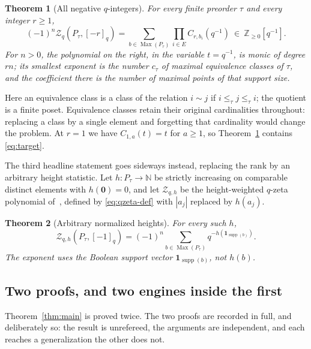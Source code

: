 \documentclass[11pt]{article}
\numberwithin{equation}{section}
\newtheorem{theorem}{Theorem}[section]
\theoremstyle{definition}
\theoremstyle{remark}
\newcommand{\N}{\mathbb N}
\newcommand{\Z}{\mathbb Z}
\newcommand{\one}{\mathbf 1}
\newcommand{\zero}{\mathbf 0}
\newcommand{\supp}{\operatorname{supp}}
\newcommand{\Max}{\operatorname{Max}}
\newcommand{\qint}[1]{[#1]_q}
\newcommand{\Zeta}{\mathcal Z}
\begin{document}
\begin{theorem}[All negative $q$-integers]
\label{thm:allnegative}
For every finite preorder $\tau$ and every integer $r\ge1$,
\begin{equation}
 (-1)^n \Zeta_q(P_\tau,\qint{-r})
 =\sum_{b\in \Max(P_\tau)}\prod_{i\in E}C_{r,b_i}(q^{-1})
 \ \in\ \Z_{\ge0}[q^{-1}].
 \label{eq:allnegative}
\end{equation}
For $n>0$, the polynomial on the right, in the variable $t=q^{-1}$, is monic
of degree $rn$; its smallest exponent is the number $c_\tau$ of maximal
equivalence classes of $\tau$, and the coefficient there is the number of
maximal points of that support size.
\end{theorem}

Here an equivalence class is a class of the relation $i\sim j$ if $i\le_\tau
j\le_\tau i$; the quotient is a finite poset. Equivalence classes retain their
original cardinalities throughout: replacing a class by a single element and
forgetting that cardinality would change the problem. At $r=1$ we have
$C_{1,a}(t)=t$ for $a\ge1$, so Theorem~\ref{thm:allnegative} contains
\eqref{eq:target}.

The third headline statement goes sideways instead, replacing the rank by an
arbitrary height statistic. Let $h:P_\tau\to\N$ be strictly increasing on
comparable distinct elements with $h(\zero)=0$, and let $\Zeta_{q,h}$ be the
height-weighted $q$-zeta polynomial of~\cite{Chapoton}, defined by
\eqref{eq:qzeta-def} with $|a_j|$ replaced by $h(a_j)$.

\begin{theorem}[Arbitrary normalized heights]
\label{thm:height-intro}
For every such $h$,
\begin{equation}
 \Zeta_{q,h}(P_\tau,\qint{-1})
 =(-1)^n\sum_{b\in\Max(P_\tau)}q^{-h(\one_{\supp(b)})}.
 \label{eq:height-intro}
\end{equation}
The exponent uses the \emph{Boolean support vector} $\one_{\supp(b)}$, not
$h(b)$.
\end{theorem}

\subsection{Two proofs, and two engines inside the first}
\label{sec:roadmap}

Theorem~\ref{thm:main} is proved twice. The two proofs are recorded in full,
and deliberately so: the result is unrefereed, the arguments are independent,
and each reaches a generalization the other does not.
\end{document}
